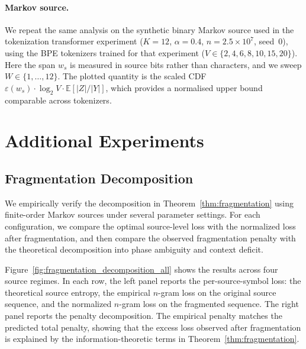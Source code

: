 \documentclass{article}
\theoremstyle{plain}
\theoremstyle{definition}
\theoremstyle{remark}
\begin{document}
\paragraph{Markov source.}
We repeat the same analysis on the synthetic binary Markov source used in
the tokenization transformer experiment ($K=12$, $\alpha=0.4$,
$n=2.5\times10^7$, seed~0), using the BPE tokenizers trained for that
experiment ($V \in \{2,4,6,8,10,15,20\}$).
Here the span $w_s$ is measured in source bits rather than characters, and
we sweep $W \in \{1,\ldots,12\}$.
The plotted quantity is the scaled CDF
$\varepsilon(w_s) \cdot \log_2 V \cdot \mathbb{E}[|Z|/|Y|]$,
which provides a normalised upper bound comparable across tokenizers.
    
     \section{Additional Experiments} \label{sec:additionalsynth}




   \subsection{Fragmentation Decomposition}
\label{app:fragmentation_decomposition}

We empirically verify the decomposition in Theorem~\ref{thm:fragmentation}
using finite-order Markov sources under several parameter settings. For each
configuration, we compare the optimal source-level loss with the normalized
loss after fragmentation, and then compare the observed fragmentation penalty
with the theoretical decomposition into phase ambiguity and context deficit.

Figure~\ref{fig:fragmentation_decomposition_all} shows the results across four
source regimes. In each row, the left panel reports the per-source-symbol loss:
the theoretical source entropy, the empirical $n$-gram loss on the original
source sequence, and the normalized $n$-gram loss on the fragmented sequence.
The right panel reports the penalty decomposition. The empirical penalty
matches the predicted total penalty, showing that the excess loss observed after
fragmentation is explained by the information-theoretic terms in
Theorem~\ref{thm:fragmentation}.
\end{document}

